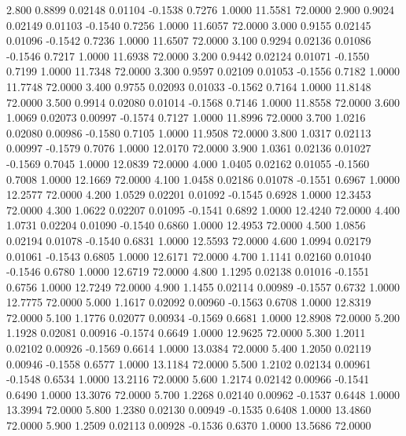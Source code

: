    2.800   0.8899   0.02148   0.01104  -0.1538   0.7276   1.0000  11.5581  72.0000
   2.900   0.9024   0.02149   0.01103  -0.1540   0.7256   1.0000  11.6057  72.0000
   3.000   0.9155   0.02145   0.01096  -0.1542   0.7236   1.0000  11.6507  72.0000
   3.100   0.9294   0.02136   0.01086  -0.1546   0.7217   1.0000  11.6938  72.0000
   3.200   0.9442   0.02124   0.01071  -0.1550   0.7199   1.0000  11.7348  72.0000
   3.300   0.9597   0.02109   0.01053  -0.1556   0.7182   1.0000  11.7748  72.0000
   3.400   0.9755   0.02093   0.01033  -0.1562   0.7164   1.0000  11.8148  72.0000
   3.500   0.9914   0.02080   0.01014  -0.1568   0.7146   1.0000  11.8558  72.0000
   3.600   1.0069   0.02073   0.00997  -0.1574   0.7127   1.0000  11.8996  72.0000
   3.700   1.0216   0.02080   0.00986  -0.1580   0.7105   1.0000  11.9508  72.0000
   3.800   1.0317   0.02113   0.00997  -0.1579   0.7076   1.0000  12.0170  72.0000
   3.900   1.0361   0.02136   0.01027  -0.1569   0.7045   1.0000  12.0839  72.0000
   4.000   1.0405   0.02162   0.01055  -0.1560   0.7008   1.0000  12.1669  72.0000
   4.100   1.0458   0.02186   0.01078  -0.1551   0.6967   1.0000  12.2577  72.0000
   4.200   1.0529   0.02201   0.01092  -0.1545   0.6928   1.0000  12.3453  72.0000
   4.300   1.0622   0.02207   0.01095  -0.1541   0.6892   1.0000  12.4240  72.0000
   4.400   1.0731   0.02204   0.01090  -0.1540   0.6860   1.0000  12.4953  72.0000
   4.500   1.0856   0.02194   0.01078  -0.1540   0.6831   1.0000  12.5593  72.0000
   4.600   1.0994   0.02179   0.01061  -0.1543   0.6805   1.0000  12.6171  72.0000
   4.700   1.1141   0.02160   0.01040  -0.1546   0.6780   1.0000  12.6719  72.0000
   4.800   1.1295   0.02138   0.01016  -0.1551   0.6756   1.0000  12.7249  72.0000
   4.900   1.1455   0.02114   0.00989  -0.1557   0.6732   1.0000  12.7775  72.0000
   5.000   1.1617   0.02092   0.00960  -0.1563   0.6708   1.0000  12.8319  72.0000
   5.100   1.1776   0.02077   0.00934  -0.1569   0.6681   1.0000  12.8908  72.0000
   5.200   1.1928   0.02081   0.00916  -0.1574   0.6649   1.0000  12.9625  72.0000
   5.300   1.2011   0.02102   0.00926  -0.1569   0.6614   1.0000  13.0384  72.0000
   5.400   1.2050   0.02119   0.00946  -0.1558   0.6577   1.0000  13.1184  72.0000
   5.500   1.2102   0.02134   0.00961  -0.1548   0.6534   1.0000  13.2116  72.0000
   5.600   1.2174   0.02142   0.00966  -0.1541   0.6490   1.0000  13.3076  72.0000
   5.700   1.2268   0.02140   0.00962  -0.1537   0.6448   1.0000  13.3994  72.0000
   5.800   1.2380   0.02130   0.00949  -0.1535   0.6408   1.0000  13.4860  72.0000
   5.900   1.2509   0.02113   0.00928  -0.1536   0.6370   1.0000  13.5686  72.0000
